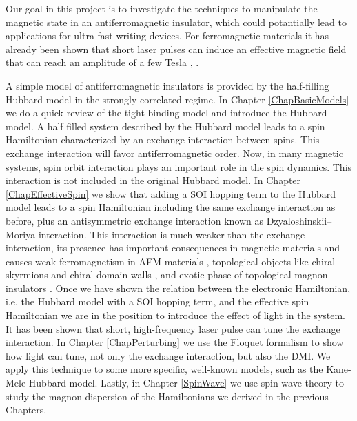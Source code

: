 Our goal in this project is to investigate the techniques to manipulate the magnetic state in an antiferromagnetic insulator, which could potantially lead to applications for ultra-fast writing devices. For ferromagnetic materials it has already been shown that short laser pulses can induce an effective magnetic field that can reach an amplitude of a few Tesla \cite{Qaiumzadeh2016}, \cite{Qaiumzadeh2013}.

A simple model of antiferromagnetic insulators is provided by the half-filling Hubbard model in the strongly correlated regime. In Chapter \ref{ChapBasicModels} we do a quick review of the tight binding model and introduce the Hubbard model. A half filled system described by the Hubbard model leads to a spin Hamiltonian characterized by an exchange interaction between spins. This exchange interaction will favor antiferromagnetic order. Now, in many magnetic systems, spin orbit interaction plays an important role in the spin dynamics. This interaction is not included in the original Hubbard model. In Chapter \ref{ChapEffectiveSpin} we show that adding a SOI hopping term to the Hubbard model leads to a spin Hamiltonian including the same exchange interaction as before, plus an antisymmetric exchange interaction known as Dzyaloshinskii–Moriya interaction. This interaction is much weaker than the exchange interaction, its presence has important consequences in magnetic materials and causes weak ferromagnetism in AFM materials \cite{dzyaloshinsky1958, Moriya1960}, topological objects like chiral skyrmions \cite{muhlbauer2009,Fert2017,Alireza-DMI1,Alireza-DMI2} and chiral domain walls \cite{Thiaville2012,Parkin,AlirezaSW}, and exotic phase of topological magnon insulators \cite{Owerre2016,Elyasi2018,Chen2018,Owerre1,Owerre2}. Once we have shown the relation between the electronic Hamiltonian, i.e. the Hubbard model with a SOI hopping term, and the effective spin Hamiltonian we are in the position to introduce the effect of light in the system. It has been shown that short, high-frequency laser pulse can tune the exchange interaction\cite{Mentink2014,Itin2015,Mentink2015,Meyer2017,Stepanov2017,Kitamura2017,MentinkReview,Barbeau2018}. In Chapter \ref{ChapPerturbing} we use the Floquet formalism to show how light can tune, not only the exchange interaction, but also the DMI. We apply this technique to some more specific, well-known models, such as the Kane-Mele-Hubbard model. Lastly, in Chapter \ref{SpinWave} we use spin wave theory to study the magnon dispersion of the Hamiltonians we derived in the previous Chapters.





















